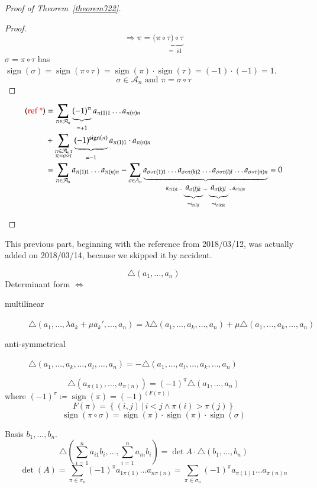 \documentclass{article}
\newcommand{\setdef}[2]{\left\{\left.#1\,\right|\,#2\right\}}
\DeclareMathOperator{\sign}{sign}
\begin{document}
\begin{proof}[Proof of Theorem~\ref{theorem722}]
\begin{enumerate}
\begin{proof}
        \[ \Rightarrow \pi = (\pi \circ \underbrace{\tau) \circ \tau}_{= \operatorname{id}} \]
        $\sigma = \pi \circ \tau$ has $\sign(\sigma) = \sign(\pi \circ \tau) = \sign(\pi) \cdot \sign(\tau) = (-1) \cdot (-1) = 1$.
        \[ \sigma \in \mathcal A_n \text{ and } \pi = \sigma \circ \tau \]
      \end{proof}
      \begin{align*}
        \text{({\color{red} ref *})} &= \sum_{\pi \in \mathcal A_n} \underbrace{(-1)^\pi}_{=+1} a_{\pi(1) 1} \dots a_{\pi(n) n} \\
          &+ \sum_{\substack{\pi \in \mathcal A_n \tau \\ \pi = \sigma \circ \tau}} \underbrace{(-1)^{\sign(\pi)}}_{= -1} a_{\pi(1) 1} \cdot a_{\pi(n) n} \\
          &= \sum_{\pi \in \mathcal A_n} a_{\pi(1) 1} \dots a_{\pi(n) n} - \sum_{\sigma \in A_n} \underbrace{a_{\sigma \circ \tau(1) 1} \dots a_{\sigma \circ \tau(k) 2} \dots a_{\sigma \circ \tau(l) l} \dots a_{\sigma \circ \tau(n) n}}_{a_{\sigma(1) 1} \dots \underbrace{a_{\sigma(l) k}}_{=a_{\sigma(l) l}} \dots \underbrace{a_{\sigma(k) l}}_{= a_{\sigma(k) k}} \dots a_{\sigma(n) n}} = 0
      \end{align*}
  \end{enumerate}
\end{proof}

This previous part, beginning with the reference from 2018/03/12, was actually added on 2018/03/14, because we skipped it by accident.

\[ \triangle(a_1, \dots, a_n) \]
Determinant form $\iff$
\begin{description}
  \item[multilinear] $\triangle(a_1, \dots, \lambda a_k + \mu a_k', \dots, a_n) = \lambda \triangle(a_1, \dots, a_k, \dots, a_n) + \mu \triangle(a_1, \dots, a_k, \dots, a_n)$
  \item[anti-symmetrical] $\triangle(a_1, \dots, a_k, \dots, a_l, \dots, a_n) = -\triangle(a_1, \dots, a_l, \dots, a_k, \dots, a_n)$
\end{description}

\[ \triangle (a_{\pi(1)}, \dots, a_{\pi(n)}) = (-1)^\pi \triangle(a_1,\dots,a_n) \]
where $(-1)^\pi \coloneqq \sign(\pi) = (-1)^{(F(\pi))}$
\[ F(\pi) = \setdef{(i,j)}{i < j \land \pi(i) > \pi(j)} \]
\[ \sign(\pi \circ \sigma) = \sign(\pi) \cdot \sign(\pi) \cdot \sign(\sigma) \]

Basis $b_1,\dots,b_n$.
\[ \triangle(\sum_{i=1}^n a_{i1} b_i, \dots, \sum_{i=1}^n a_{in} b_i) = \det{A} \cdot \triangle(b_1, \dots, b_n) \]
\[ \det(A) = \sum_{\pi \in \sigma_n} (-1)^\pi  a_{1\pi(1)} \dots a_{n\pi(n)} = \sum_{\pi \in \sigma_n} (-1)^\pi a_{\pi(1) 1} \dots a_{\pi(n) n} \]
\end{document}
